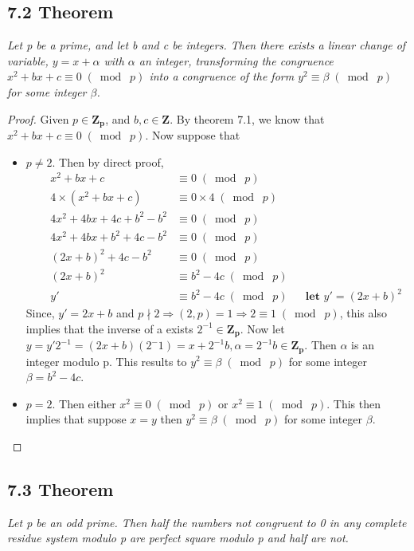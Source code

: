 \documentclass{article}
\begin{document}
\subsection*{7.2 Theorem} 
\quad \textit{Let p be a prime, and let b and c be integers. Then there exists a linear change of variable, $y = x+\alpha$ with $\alpha$ an integer, transforming the congruence $x^2 + bx + c \equiv 0 \;(\bmod\; p)$ into a congruence of the form $y^2 \equiv \beta \;(\bmod\; p)$ for some integer $\beta$.}

\begin{proof}
Given $p \in \mathbf{Z_p}$, and  $b, c \in \mathbf{Z}$. By theorem 7.1, we know that $x^2 + bx + c \equiv 0 \;(\bmod\; p)$. Now suppose that

\begin{itemize}
    \item $p \neq 2$. Then by direct proof,
\begin{align*}
    && x^2 + bx + c &\equiv 0 \;(\bmod\; p) &&\\
    && 4 \times (x^2 + bx + c) &\equiv 0\times 4 \;(\bmod\; p) &&\\
    && 4x^2 + 4bx + 4c + b^2 - b^2 &\equiv 0 \;(\bmod\; p) &&\\
    && 4x^2 + 4bx + b^2 + 4c  - b^2 &\equiv 0 \;(\bmod\; p) &&\\
    && (2x+b)^2 + 4c - b^2 &\equiv 0 \;(\bmod\; p) &&\\
    && (2x+b)^2 &\equiv b^2 - 4c \;(\bmod\; p) &&\\
    && y' &\equiv b^2 - 4c \;(\bmod\; p) &&\textbf{let $y' = (2x +b)^2$}
\end{align*}
Since, $y' = 2x +b$ and $p \nmid 2 \Longrightarrow (2,p) = 1 \Longrightarrow 2 \equiv 1 \;(\bmod\; p)$, this also implies that the inverse of a exists $2^{-1} \in \mathbf{Z_p}$. Now let $y = y'2^{-1} = (2x +b)(2^-1) = x + 2^{-1}b, \alpha = 2^{-1}b \in \mathbf{Z_p}$. Then $\alpha$ is an integer modulo p. This results to $y^2 \equiv \beta \;(\bmod\; p)$ for some integer $\beta = b^2 - 4c$.
    \item $p = 2$. Then either $x^2 \equiv 0 \;(\bmod\; p)$ or $x^2 \equiv 1 \;(\bmod\; p)$. This then implies that suppose $x=y$ then $y^2 \equiv \beta \;(\bmod\; p)$ for some integer $\beta$. 
\end{itemize}
\end{proof}

\subsection*{7.3 Theorem}
\quad \textit{Let p be an odd prime. Then half the numbers not congruent to 0 in any complete residue system modulo p are perfect square modulo p and half are not.}
\end{document}
